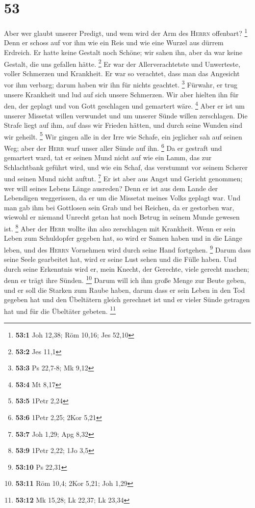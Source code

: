 \hypertarget{section-19}{%
\section{53}\label{section-19}}

 Aber wer glaubt unserer Predigt, und wem wird der Arm des
\textsc{Herrn} offenbart? \footnote{\textbf{53:1} Joh 12,38; Röm 10,16;
  Jes 52,10}  Denn er schoss auf vor ihm wie ein Reis und
wie eine Wurzel aus dürrem Erdreich. Er hatte keine Gestalt noch Schöne;
wir sahen ihn, aber da war keine Gestalt, die uns gefallen hätte.
\footnote{\textbf{53:2} Jes 11,1}  Er war der
Allerverachtetste und Unwerteste, voller Schmerzen und Krankheit. Er war
so verachtet, dass man das Angesicht vor ihm verbarg; darum haben wir
ihn für nichts geachtet. \footnote{\textbf{53:3} Ps 22,7-8; Mk 9,12}
 Fürwahr, er trug unsere Krankheit und lud auf sich unsere
Schmerzen. Wir aber hielten ihn für den, der geplagt und von Gott
geschlagen und gemartert wäre. \footnote{\textbf{53:4} Mt 8,17}
 Aber er ist um unserer Missetat willen verwundet und um
unserer Sünde willen zerschlagen. Die Strafe liegt auf ihm, auf dass wir
Frieden hätten, und durch seine Wunden sind wir geheilt. \footnote{\textbf{53:5}
  1Petr 2,24}  Wir gingen alle in der Irre wie Schafe, ein
jeglicher sah auf seinen Weg; aber der \textsc{Herr} warf unser aller
Sünde auf ihn. \footnote{\textbf{53:6} 1Petr 2,25; 2Kor 5,21}
 Da er gestraft und gemartert ward, tat er seinen Mund
nicht auf wie ein Lamm, das zur Schlachtbank geführt wird, und wie ein
Schaf, das verstummt vor seinem Scherer und seinen Mund nicht auftut.
\footnote{\textbf{53:7} Joh 1,29; Apg 8,32}  Er ist aber
aus Angst und Gericht genommen; wer will seines Lebens Länge ausreden?
Denn er ist aus dem Lande der Lebendigen weggerissen, da er um die
Missetat meines Volks geplagt war.  Und man gab ihm bei
Gottlosen sein Grab und bei Reichen, da er gestorben war, wiewohl er
niemand Unrecht getan hat noch Betrug in seinem Munde gewesen ist.
\footnote{\textbf{53:9} 1Petr 2,22; 1Jo 3,5}  Aber der
\textsc{Herr} wollte ihn also zerschlagen mit Krankheit. Wenn er sein
Leben zum Schuldopfer gegeben hat, so wird er Samen haben und in die
Länge leben, und des \textsc{Herrn} Vornehmen wird durch seine Hand
fortgehen. \footnote{\textbf{53:10} Ps 22,31}  Darum dass
seine Seele gearbeitet hat, wird er seine Lust sehen und die Fülle
haben. Und durch seine Erkenntnis wird er, mein Knecht, der Gerechte,
viele gerecht machen; denn er trägt ihre Sünden. \footnote{\textbf{53:11}
  Röm 10,4; 2Kor 5,21; Joh 1,29}  Darum will ich ihm
große Menge zur Beute geben, und er soll die Starken zum Raube haben,
darum dass er sein Leben in den Tod gegeben hat und den Übeltätern
gleich gerechnet ist und er vieler Sünde getragen hat und für die
Übeltäter gebeten. \footnote{\textbf{53:12} Mk 15,28; Lk 22,37; Lk 23,34}

